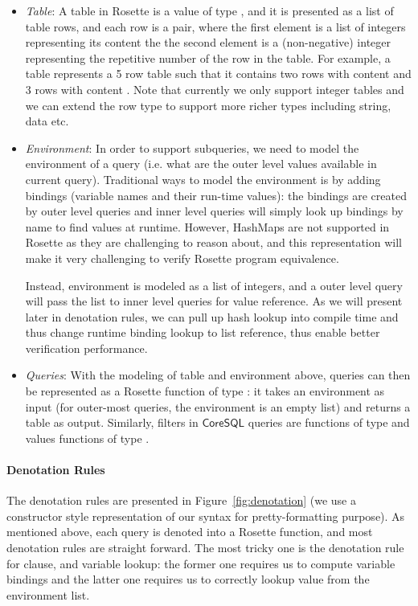 \begin{itemize}\itemsep0pt
\item \emph{Table}: A table in Rosette is a value of type , and it is presented as a list of table rows, and each row is a pair, where the first element is a list of integers representing its content the the second element is a (non-negative) integer representing the repetitive number of the row in the table. For example, a table  represents a 5 row table such that it contains two rows with content  and 3 rows with content . Note that currently we only support integer tables and we can extend the row type to support more richer types including string, data etc.

\item \emph{Environment}: In order to support subqueries, we need to model the environment of a query (i.e. what are the outer level values available in current query). Traditional ways to model the environment is by adding bindings (variable names and their run-time values): the bindings are created by outer level queries and inner level queries will simply look up bindings by name to find values at runtime. However, HashMaps are not supported in Rosette as they are challenging to reason about, and this representation will make it very challenging to verify Rosette program equivalence. 

Instead, environment is modeled as a list of integers, and a outer level query will pass the list to inner level queries for value reference. As we will present later in denotation rules, we can pull up hash lookup into compile time and thus change runtime binding lookup to list reference, thus enable better verification performance.

\item \emph{Queries}: With the modeling of table and environment above, queries can then be represented as a Rosette function of type : it takes an environment as input (for outer-most queries, the environment is an empty list) and returns a table as output. Similarly, filters in $\mathsf{CoreSQL}$ queries are functions of type  and values functions of type  .
\end{itemize}

\paragraph{Denotation Rules} The denotation rules are presented in Figure~\ref{fig:denotation} (we use a constructor style representation of our syntax for pretty-formatting purpose). As mentioned above, each query is denoted into a Rosette function, and most denotation rules are straight forward. The most tricky one is the denotation rule for  clause, and variable lookup: the former one requires us to compute variable bindings and the latter one requires us to correctly lookup value from the environment list.

